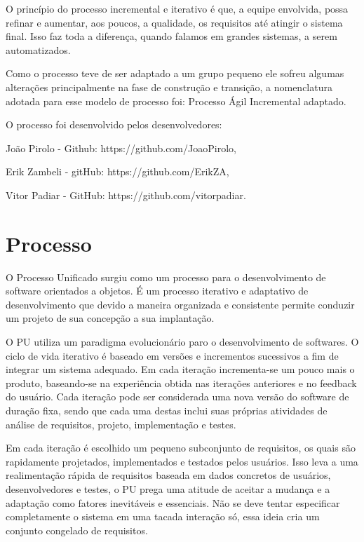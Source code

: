\documentclass[	DIV=calc,%
							paper=a4,%
							fontsize=12pt,%
							onecolumn]{scrartcl}	 					%
\begin{document}
O princípio do processo incremental e iterativo é que, a equipe envolvida, possa refinar e aumentar, aos poucos, a qualidade, os requisitos até atingir o sistema final.  Isso faz toda a diferença, quando falamos em grandes sistemas, a serem automatizados.   

Como o processo teve de ser adaptado a um grupo pequeno ele sofreu algumas alterações principalmente na fase de construção e transição, a nomenclatura adotada para esse modelo de processo foi: Processo Ágil Incremental adaptado.

O processo foi desenvolvido pelos desenvolvedores:
\begin{itemize}
{\item João Pirolo - Github: https://github.com/JoaoPirolo,
\item Erik Zambeli - gitHub: https://github.com/ErikZA, 
\item Vitor Padiar - GitHub: https://github.com/vitorpadiar.}
\end{itemize} 
\section{Processo}

 O Processo Unificado surgiu como um processo para o desenvolvimento de software orientados a objetos. É um processo iterativo e adaptativo de desenvolvimento que devido a maneira organizada e consistente permite conduzir um projeto de sua concepção a sua implantação.
 
 O PU utiliza um paradigma evolucionário paro o desenvolvimento de softwares. O ciclo de vida iterativo é baseado em versões e incrementos sucessivos a fim de integrar um sistema adequado. Em cada iteração incrementa-se um pouco mais o produto, baseando-se na experiência obtida nas iterações anteriores e no feedback do usuário. Cada iteração pode ser considerada uma nova versão do software de duração fixa, sendo que cada uma destas inclui suas próprias atividades de análise de requisitos, projeto, implementação e testes.
 
  Em cada iteração é escolhido um pequeno subconjunto de requisitos, os quais são rapidamente projetados, implementados e testados pelos usuários. Isso leva a uma realimentação rápida de requisitos baseada em dados concretos de usuários, desenvolvedores e testes, o PU prega uma atitude de aceitar a mudança e a adaptação como fatores inevitáveis e essenciais. Não se deve tentar especificar completamente o sistema em uma tacada interação só, essa ideia cria um conjunto congelado de requisitos.
 
\end{document}

